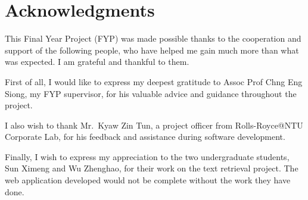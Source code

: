 \chapter*{Acknowledgments}

This Final Year Project (FYP) was made possible thanks to the cooperation and support of the following people, who have helped me gain much more than what was expected. I am grateful and thankful to them.

First of all, I would like to express my deepest gratitude to Assoc Prof Chng Eng Siong, my FYP supervisor, for his valuable advice and guidance throughout the project.

I also wish to thank Mr.~Kyaw Zin Tun, a project officer from Rolls-Royce@NTU Corporate Lab, for his feedback and assistance during software development.

Finally, I wish to express my appreciation to the two undergraduate students, Sun Ximeng and Wu Zhenghao, for their work on the text retrieval project. The web application developed would not be complete without the work they have done.

